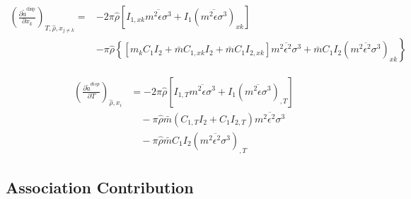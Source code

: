 \documentclass[12pt, letterpaper]{article}
\begin{document}

\begin{equation}
    \begin{aligned}
        \left(\frac{\partial \tilde{a}^{\mathrm{disp}}}{\partial x_k}\right)_{T,\hat{\rho},x_{j \neq k}}
        =& -2 \pi \hat{\rho}\left[I_{1, x k} \overline{m^2 \epsilon \sigma^3}+I_1 \left(\overline{m^2 \epsilon \sigma^3}\right)_{x k}\right] \\
        &- \pi \hat{\rho}\left\{\left[m_k C_1 I_2+\bar{m} C_{1, x k} I_2+\bar{m} C_1 I_{2, x k}\right] \overline{m^2 \epsilon^2 \sigma^3}+\right.
        \left.\bar{m} C_1 I_2\left(\overline{m^2 \epsilon^2 \sigma^3}\right)_{x k}\right\}
    \end{aligned}
    \label{eq:disp_ares_dxk}
\end{equation}


\begin{equation}
    \begin{aligned}
        \left(\frac{\partial\tilde{a}^{disp}}{\partial T}\right)_{\hat{\rho},x_{i}}
        &=-2\pi\hat{\rho}\left[I_{1,T}\overline{m^{2}\epsilon\sigma^{3}}+I_{1}\left(\overline{m^{2}\epsilon\sigma^{3}}\right)_{,T}\right]
        \\
        &\quad-\pi\hat{\rho}\bar{m}\left(C_{1,T}I_{2}+C_{1}I_{2,T}\right)\overline{m^{2}\epsilon^{2}\sigma^{3}}
        \\
        &\quad-\pi\hat{\rho}\bar{m}C_{1}I_{2}\left(\overline{m^{2}\epsilon^{2}\sigma^{3}}\right)_{,T}
    \end{aligned}
    \label{eq:disp_ares_dT}
\end{equation}


\subsection{Association Contribution}
\end{document}

